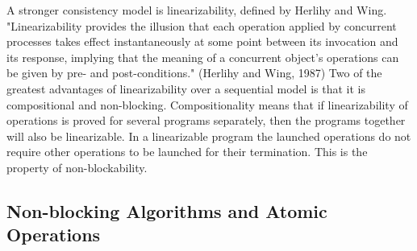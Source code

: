 \documentclass[oneside, a4paper, onecolumn, 10pt]{article}
\begin{document}
A stronger consistency model is linearizability, defined by Herlihy and Wing. \cite{HerlihyWing} "Linearizability provides the illusion that each operation applied by concurrent processes takes effect instantaneously at some point between its invocation and its response, implying that the meaning of a concurrent object’s operations can be given by pre- and post-conditions." (Herlihy and Wing, 1987) Two of the greatest advantages of linearizability over a sequential model is that it is compositional and non-blocking. Compositionality means that if linearizability of operations is proved for several programs separately, then the programs together will also be linearizable. In a linearizable program the launched operations do not require other operations to be launched for their termination. This is the property of non-blockability. 
\subsection{Non-blocking Algorithms and Atomic Operations}
\end{document}
